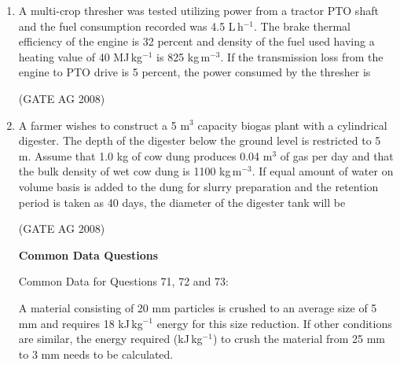 \documentclass[journal]{IEEEtran}
\begin{document}
\begin{enumerate}
\medskip

\item 
 A multi-crop thresher was tested utilizing power from a tractor PTO shaft and the fuel consumption recorded was 4.5 L\,h$^{-1}$. The brake thermal efficiency of the engine is 32 percent and density of the fuel used having a heating value of 40 MJ\,kg$^{-1}$ is 825 kg\,m$^{-3}$. If the transmission loss from the engine to PTO drive is 5 percent, the power consumed by the thresher is
\begin{enumerate}
\end{enumerate}
\hfill(GATE AG 2008)\\

\medskip

\item 
 A farmer wishes to construct a 5 m$^3$ capacity biogas plant with a cylindrical digester. The depth of the digester below the ground level is restricted to 5 m. Assume that 1.0 kg of cow dung produces 0.04 m$^3$ of gas per day and that the bulk density of wet cow dung is 1100 kg\,m$^{-3}$. If equal amount of water on volume basis is added to the dung for slurry preparation and the retention period is taken as 40 days, the diameter of the digester tank will be
\begin{enumerate}
\end{enumerate}
\hfill(GATE AG 2008)\\

\medskip

\textbf{Common Data Questions}

Common Data for Questions 71, 72 and 73:

A material consisting of 20 mm particles is crushed to an average size of 5 mm and requires 18 kJ\,kg$^{-1}$ energy for this size reduction. If other conditions are similar, the energy required (kJ\,kg$^{-1}$) to crush the material from 25 mm to 3 mm needs to be calculated.


\end{enumerate}
\end{document}
